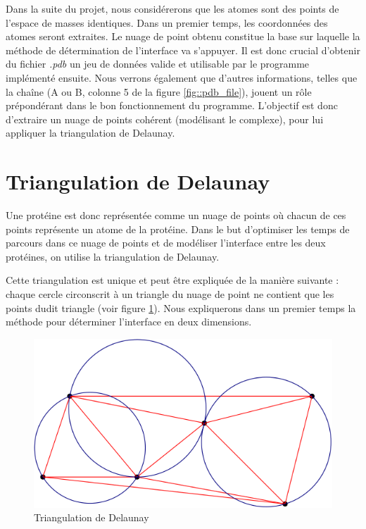Dans la suite du projet, nous considérerons que les atomes sont des points de l'espace
de masses identiques. Dans un premier temps, les coordonnées des atomes seront extraites.
Le nuage de point obtenu constitue la base sur laquelle la méthode de détermination
de l'interface va s'appuyer. Il est donc crucial d'obtenir du fichier \textit{.pdb} un jeu
de données valide et utilisable par le programme implémenté ensuite. Nous verrons également
que d'autres informations, telles que la chaîne (A ou B, colonne 5 de la figure
\ref{fig::pdb_file}), jouent un rôle prépondérant dans le bon fonctionnement du
programme. L'objectif est donc d'extraire un nuage de points cohérent (modélisant
le complexe), pour lui appliquer la triangulation de Delaunay.



\section{Triangulation de Delaunay}

Une protéine est donc représentée comme un nuage de points où chacun de ces points
représente un atome de la protéine. Dans le but d'optimiser les temps de parcours dans
ce nuage de points et de modéliser l'interface entre les deux protéines,
 on utilise la triangulation de Delaunay.

 Cette triangulation est unique et peut être expliquée de la manière suivante :
 chaque cercle circonscrit à un triangle du nuage de point ne contient que les points
 dudit triangle (voir figure \ref{fig::explication_delaunay}).
 Nous expliquerons dans un premier
 temps la méthode pour déterminer l'interface en deux dimensions.

\begin{figure}[ht]
\centering
  \includegraphics[width=\textwidth]{figures/explication_delaunay.png}
  \caption{Triangulation de Delaunay}
  \label{fig::explication_delaunay}
\end{figure}

